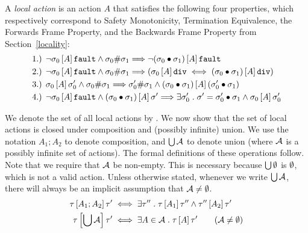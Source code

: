 A \emph{local action} is an action $A$ that satisfies the following four properties, which respectively correspond to Safety Monotonicity,
Termination Equivalence, the Forwards Frame Property, and the Backwards Frame Property from Section~\ref{locality}:
\begin{align*}
& \text{1.) } \lnot \relatebr{A}{\sigma_0}{\fault} \land \sigma_0 \# \sigma_1 \Longrightarrow 
  \lnot \relatebr{A}{(\sigma_0 \dt \sigma_1)}{\fault} \\
& \text{2.) } \lnot \relatebr{A}{\sigma_0}{\fault} \land \sigma_0 \# \sigma_1 \Longrightarrow 
  (\relatebr{A}{\sigma_0}{\dvg} \iff \relatebr{A}{(\sigma_0 \dt \sigma_1)}{\dvg}) \\
& \text{3.) } \relatebr{A}{\sigma_0}{\sigma_0'} \land \sigma_0 \# \sigma_1 \Longrightarrow 
  \sigma_0' \# \sigma_1 \land \relatebr{A}{(\sigma_0 \dt \sigma_1)}{(\sigma_0' \dt \sigma_1)} \\
& \text{4.) } \lnot \relatebr{A}{\sigma_0}{\fault} \land \relatebr{A}{(\sigma_0 \dt \sigma_1)}{\sigma'} \Longrightarrow
\exists \sigma_0' \such \sigma' = \sigma_0' \dt \sigma_1 \land \relatebr{A}{\sigma_0}{\sigma_0'}
\end{align*}

We denote the set of all local actions by \locact.
We now show that the set of local actions is closed under composition and (possibly infinite) union. We use the notation
$A_1;A_2$ to denote composition, and $\bigcup \A$ to denote union (where $\A$ is a possibly infinite set of actions). The formal
definitions of these operations follow. Note that we require that $\A$ be non-empty. This is necessary because $\bigcup \emp$
is $\emp$, which is not a valid action. Unless otherwise stated, whenever we write $\bigcup \A$, there will always be an implicit
assumption that $\A \neq \emp$.
\begin{align*} 
\relatebr{A_1;A_2}{\tau}{\tau'} & \iff \exists \tau'' \such \relatebr{A_1}{\tau}{\tau''} \land \relatebr{A_2}{\tau''}{\tau'} \\
\relatebr{\bigcup \A}{\tau}{\tau'} & \iff \exists A \in \A \such \relatebr{A}{\tau}{\tau'} \quad \quad (\A \neq \emp)
\end{align*}

